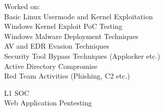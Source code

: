 \documentclass[]{resume}
\begin{document}
\begin{minipage}[t]{0.66\textwidth}
     
    \noindent

    \vspace{-8pt}
    \hspace{5em}
    \begin{minipage}{0.85\textwidth\vspace{2pt}}
        Worked on:\\
        Basic Linux Usermode and Kernel Exploitation\\
        Windows Kernel Exploit PoC Testing\\
        Windows Malware Deployment Techniques\\
        AV and EDR Evasion Techniques\\
        Security Tool Bypass Techniques (Applocker etc.)\\
        Active Directory Compromise\\
        Red Team Activities (Phishing, C2 etc.)
    \end{minipage}

    \vspace{8pt}
     
    \noindent

    \vspace{-8pt}
    \hspace{5em}
    \begin{minipage}{0.85\textwidth\vspace{2pt}}
        L1 SOC\\
        Web Application Pentesting
    \end{minipage}


    \vspace{8pt}
     
    \noindent

    \vspace{4pt}
     
    \noindent



\end{minipage}
\end{document}
